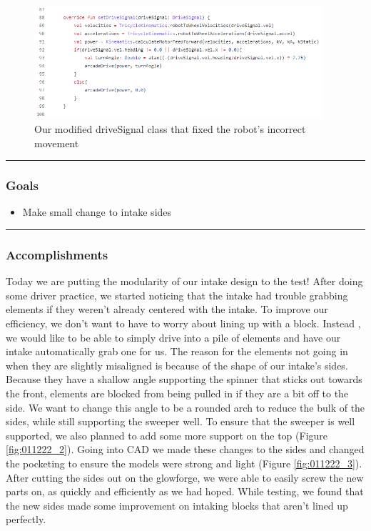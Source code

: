 \begin{figure}[htp]
\centering
\includegraphics[width=0.95\textwidth, angle=0]{Meetings/January/01-12-22/1.12.22 drivesignal - James Hu.PNG}
\caption{Our modified driveSignal class that fixed the robot's incorrect movement}
\label{fig:011222_1}
\end{figure}


	
\noindent\hfil\rule{\textwidth}{.4pt}\hfil
\subsubsection*{Goals}
\begin{itemize}
    \item Make small change to intake sides


\end{itemize} 

\noindent\hfil\rule{\textwidth}{.4pt}\hfil

\subsubsection*{Accomplishments}
Today we are putting the modularity of our intake design to the test! After doing some driver practice, we started noticing that the intake had trouble grabbing elements if they weren't already centered with the intake. To improve our efficiency, we don't want to have to worry about lining up with a block. Instead , we would like to be able to simply drive into a pile of elements and have our intake automatically grab one for us. The reason for the elements not going in when they are slightly misaligned is because of the shape of our intake’s sides. Because they have a shallow angle supporting the spinner that sticks out towards the front, elements are blocked from being pulled in if they are a bit off to the side. We want to change this angle to be a rounded arch to reduce the bulk of the sides, while still supporting the sweeper well. To ensure that the sweeper is well supported, we also planned to add some more support on the top (Figure \ref{fig:011222_2}). Going into CAD we made these changes to the sides and changed the pocketing to ensure the models were strong and light (Figure \ref{fig:011222_3}). After cutting the sides out on the glowforge, we were able to easily screw the new parts on, as quickly and efficiently as we had hoped. While testing, we found that the new sides made some improvement on intaking blocks that aren’t lined up perfectly.



